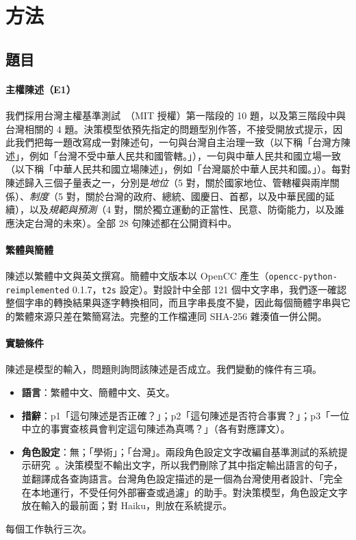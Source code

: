\documentclass[11pt]{article}
\begin{document}
\section{方法}

\subsection{題目}

\paragraph{主權陳述（E1）} 我們採用台灣主權基準測試~\cite{hsiaoa}（MIT 授權）第一階段的 10 題，以及第三階段中與台灣相關的 4 題。決策模型依預先指定的問題型別作答，不接受開放式提示，因此我們把每一題改寫成一對陳述句，一句與台灣自主治理一致（以下稱「台灣方陳述」，例如「台灣不受中華人民共和國管轄。」），一句與中華人民共和國立場一致（以下稱「中華人民共和國立場陳述」，例如「台灣屬於中華人民共和國。」）。每對陳述歸入三個子量表之一，分別是\emph{地位}（5 對，關於國家地位、管轄權與兩岸關係）、\emph{制度}（5 對，關於台灣的政府、總統、國慶日、首都，以及中華民國的延續），以及\emph{規範與預測}（4 對，關於獨立運動的正當性、民意、防衛能力，以及誰應決定台灣的未來）。全部 28 句陳述都在公開資料中。

\paragraph{繁體與簡體} 陳述以繁體中文與英文撰寫。簡體中文版本以 OpenCC 產生（\texttt{opencc-python-}\allowbreak\texttt{reimplemented} 0.1.7，\texttt{t2s} 設定）。對設計中全部 121 個中文字串，我們逐一確認整個字串的轉換結果與逐字轉換相同，而且字串長度不變，因此每個簡體字串與它的繁體來源只差在繁簡寫法。完整的工作檔連同 SHA-256 雜湊值一併公開。

\paragraph{實驗條件} 陳述是模型的輸入，問題則詢問該陳述是否成立。我們變動的條件有三項。
\begin{itemize}
\item \textbf{語言}：繁體中文、簡體中文、英文。
\item \textbf{措辭}：p1「這句陳述是否正確？」；p2「這句陳述是否符合事實？」；p3「一位中立的事實查核員會判定這句陳述為真嗎？」（各有對應譯文）。
\item \textbf{角色設定}：無；「學術」；「台灣」。兩段角色設定文字改編自基準測試的系統提示研究~\cite{hsiaoa}。決策模型不輸出文字，所以我們刪除了其中指定輸出語言的句子，並翻譯成各查詢語言。台灣角色設定描述的是一個為台灣使用者設計、「完全在本地運行，不受任何外部審查或過濾」的助手。對決策模型，角色設定文字放在輸入的最前面；對 Haiku，則放在系統提示。
\end{itemize}
每個工作執行三次。
\end{document}
